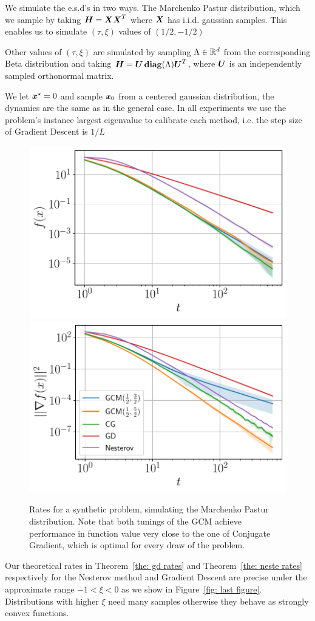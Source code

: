 \documentclass{article}
\begin{document}
We simulate the e.s.d's  in two ways. The Marchenko Pastur distribution, which we sample by taking ${\boldsymbol H}={\boldsymbol X}{\boldsymbol X}^T$ where ${\boldsymbol X}$ has i.i.d. gaussian samples. This enables us to simulate $(\tau,\xi)$ values of $(1/2,-1/2)$ 

Other values of $(\tau,\xi)$ are simulated by sampling $\Lambda \in {\mathbb R}^d$ from the corresponding Beta distribution and taking ${\boldsymbol H}={\boldsymbol U}\operatorname*{\mathbf{diag}}(\Lambda){\boldsymbol U}^T$, where ${\boldsymbol U}$ is an independently sampled orthonormal matrix. 

We let ${\boldsymbol x}^\star=0$ and sample ${\boldsymbol x}_0$ from a centered gaussian distribution, the dynamics are the same as in the general case. In all experiments we use the problem's instance largest eigenvalue to calibrate each method, i.e. the step size of Gradient Descent is $1/L$


\begin{figure}[h]
    \centering
    \includegraphics[width=6 cm]{final_imgs/mp_f.pdf}\includegraphics[width= 6 cm]{final_imgs/mp_grad.pdf}
    
    
    \caption{Rates for a synthetic problem, simulating the Marchenko Pastur distribution. Note that both tunings of the GCM achieve performance in function value very close to the one of Conjugate Gradient, which is optimal for every draw of the problem.}
    \label{fig: mp performance}
\end{figure}




Our theoretical rates in Theorem~\ref{the: gd rates} and Theorem~\ref{the: neste rates} respectively for the Nesterov method and Gradient Descent are precise under the approximate range $-1<\xi<0$  as we show in Figure~\ref{fig: last figure}. Distributions with higher $\xi$ need many samples otherwise they behave as strongly convex functions.
\end{document}
